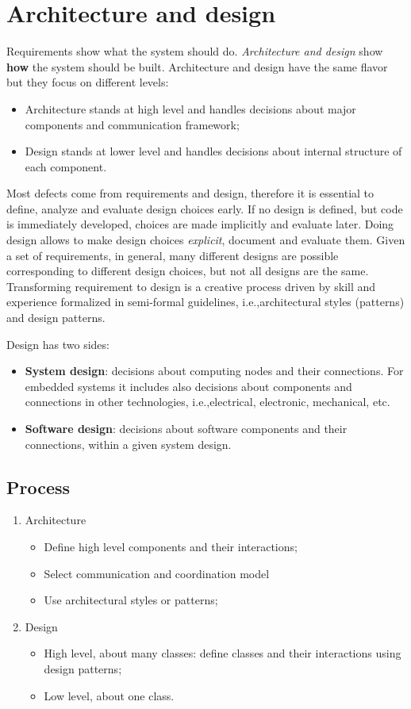 \chapter{Architecture and design}
Requirements show what the system should do. \emph{Architecture and design} show \textbf{how} the system should be built. Architecture and design have the same flavor but they focus on different levels:
\begin{itemize}
\item Architecture stands at high level and handles decisions about major components and communication framework;
\item Design stands at lower level and handles decisions about internal structure of each component.
\end{itemize}
Most defects come from requirements and design, therefore it is essential to define, analyze and evaluate design choices early. If no design is defined, but code is immediately developed, choices are made implicitly and evaluate later. Doing design allows to make design choices \emph{explicit}, document and evaluate them. Given a set of requirements, in general, many different designs are possible corresponding to different design choices, but not all designs are the same. Transforming requirement to design is a creative process driven by skill and experience formalized in semi-formal guidelines, i.e.,\@ architectural styles (patterns) and design patterns.

Design has two sides:
\begin{itemize}
\item \textbf{System design}: decisions about computing nodes and their connections. For embedded systems it includes also decisions about components and connections in other technologies, i.e.,\@ electrical, electronic, mechanical, etc.
\item \textbf{Software design}: decisions about software components and their connections, within a given system design.
\end{itemize}

\section{Process}
\begin{enumerate}
\item Architecture
\begin{itemize}
\item Define high level components and their interactions;
\item Select communication and coordination model
\item Use architectural styles or patterns;
\end{itemize}
\item Design
\begin{itemize}
\item High level, about many classes: define classes and their interactions using design patterns;
\item Low level, about one class.
\end{itemize}
\end{enumerate}

